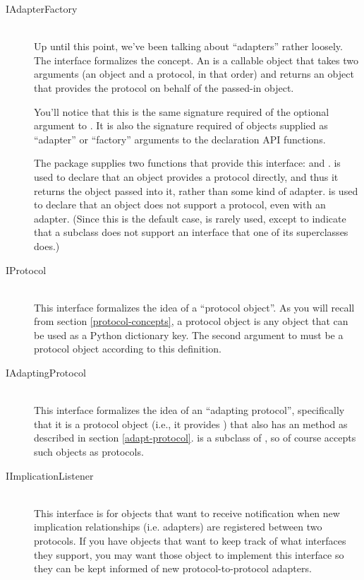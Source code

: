 \begin{verbatim%
}
\begin{verbatim%
}
\begin{verbatim%
}
\begin{verbatim%
}
\begin{verbatim%
}
\begin{verbatim%
}
\begin{description}

\item[IAdapterFactory] \hfill \\
Up until this point, we've been talking about ``adapters'' rather loosely.  The
 interface formalizes the concept.  An  is a callable object that takes two arguments (an object and a
protocol, in that order) and returns an object that provides the protocol on
behalf of the passed-in object.

You'll notice that this is the same signature required of the optional
 argument to .  It is also the signature required
of objects supplied as ``adapter'' or ``factory'' arguments to the declaration
API functions.

The  package supplies two functions that provide
this interface:  and .
 is used to declare that an object provides a
protocol directly, and thus it returns the object passed into it, rather than
some kind of adapter.   is used to declare that an
object does not support a protocol, even with an adapter.  (Since this is the
default case,  is rarely used, except to indicate
that a subclass does not support an interface that one of its superclasses
does.)

\item[IProtocol] \hfill \\
This interface formalizes the idea of a ``protocol object''.  As you will
recall from section \ref{protocol-concepts}, a protocol object is any object
that can be used as a Python dictionary key.  The second argument to
 must be a protocol object according to this definition.


\item[IAdaptingProtocol] \hfill \\
This interface formalizes the idea of an ``adapting protocol'', specifically
that it is a protocol object (i.e., it provides ) that also
has an  method as described in section \ref{adapt-protocol}.
 is a subclass of , so of course
 accepts such objects as protocols.

\item[IImplicationListener] \hfill \\
This interface is for objects that want to receive notification when new
implication relationships (i.e. adapters) are registered between two protocols.
If you have objects that want to keep track of what interfaces they support,
you may want those object to implement this interface so they can be kept
informed of new protocol-to-protocol adapters.


\end{description}
\end{verbatim%
}
\end{verbatim%
}
\end{verbatim%
}
\end{verbatim%
}
\end{verbatim%
}
\end{verbatim%
}
